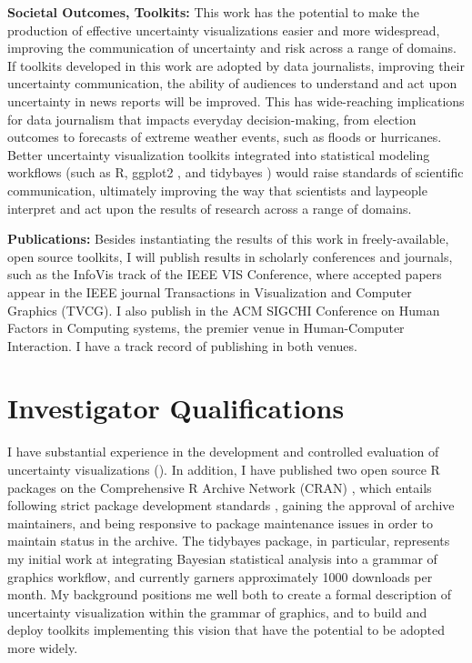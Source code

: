 \documentclass[11pt]{article}
\begin{document}
\noindent\textbf{Societal Outcomes, Toolkits:}
This work has the potential to make the production of effective uncertainty visualizations easier and more widespread, improving the communication of uncertainty and risk across a range of domains. If toolkits developed in this work are adopted by data journalists, improving their uncertainty communication, the ability of audiences to understand and act upon uncertainty in news reports will be improved. This has wide-reaching implications for data journalism that impacts everyday decision-making, from election outcomes to forecasts of extreme weather events, such as floods or hurricanes. Better uncertainty visualization toolkits integrated into statistical modeling workflows (such as R, ggplot2 \cite{wickham2016ggplot2}, and tidybayes \cite{kay2017tidybayes}) would raise standards of scientific communication, ultimately improving the way that scientists and laypeople interpret and act upon the results of research across a range of domains.

\noindent\textbf{Publications:}
Besides instantiating the results of this work in freely-available, open source toolkits, I will publish results in scholarly conferences and journals, such as the InfoVis track of the IEEE VIS Conference, where accepted papers appear in the IEEE journal Transactions in Visualization and Computer Graphics (TVCG). I also publish in the ACM SIGCHI Conference on Human Factors in Computing systems, the premier venue in Human-Computer Interaction. I have a track record of publishing in both venues.

\section{Investigator Qualifications}
\noindent I have substantial experience in the development and controlled evaluation of uncertainty visualizations (\eg \cite{Fernandes2018, kay2016bus, kale2018hypothetical, hullman2018pursuit, hullman2018imagining, greis2017uncertaintyhci}). In addition, I have published two open source R packages \cite{kay2016artool, kay2017tidybayes} on the Comprehensive R Archive Network (CRAN) \cite{hornik2012cran}, which entails following strict package development standards \cite{hornik2012cran, cran1999writing}, gaining the approval of archive maintainers, and being responsive to package maintenance issues in order to maintain status in the archive. The tidybayes \cite{kay2017tidybayes} package, in particular, represents my initial work at integrating Bayesian statistical analysis into a grammar of graphics workflow, and currently garners approximately 1000 downloads per month. My background positions me well both to create a formal description of uncertainty visualization within the grammar of graphics, and to build and deploy toolkits implementing this vision that have the potential to be adopted more widely.
\end{document}
